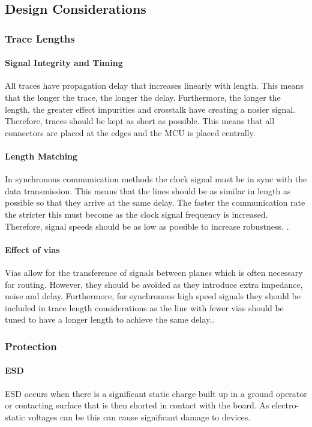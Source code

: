 \subsection{Design Considerations}

\subsubsection{Trace Lengths}
\paragraph{Signal Integrity and Timing}
All traces have propagation delay that increases linearly with length. This means that the longer the trace, the longer the delay. Furthermore, the longer the length, the greater effect impurities and crosstalk have creating a nosier signal. Therefore, traces should be kept as short as possible. This means that all connectors are placed at the edges and the \gls{MCU} is placed centrally.
\paragraph{Length Matching}
In synchronous communication methods the clock signal must be in sync with the data transmission. This means that the lines should be as similar in length as possible so that they arrive at the same delay. The faster the communication rate the stricter this must become as the clock signal frequency is increased. Therefore, signal speeds should be as low as possible to increase robustness. .
\paragraph{Effect of vias}
Vias allow for the transference of signals between planes which is often necessary for routing. However, they should be avoided as they introduce extra impedance, noise and delay. Furthermore, for synchronous high speed signals they should be included in trace length considerations as the line with fewer vias should be tuned to have a longer length to achieve the same delay..

\subsubsection{Protection}
\paragraph{\gls{ESD}}
\gls{ESD} occurs when there is a significant static charge built up in a ground operator or contacting surface that is then shorted in contact with the board. As electro-static voltages can be \cite{REF} this can cause significant damage to devices.

